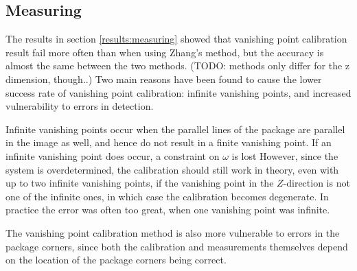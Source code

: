 
\subsection{Measuring}
The results in section \ref{results:measuring} showed that vanishing point calibration result fail more often than when using Zhang's method, but the accuracy is almost the same between the two methods. (TODO: methods only differ for the z dimension, though..) %
Two main reasons have been found to cause the lower success rate of vanishing point calibration: infinite vanishing points, and increased vulnerability to errors in detection.

Infinite vanishing points occur when the parallel lines of the package are parallel in the image as well, and hence do not result in a finite vanishing point. 
If an infinite vanishing point does occur, a constraint on $\omega$ is lost
However, since the system is overdetermined, the calibration should still work in theory, even with up to two infinite vanishing points, if the vanishing point in the $Z$-direction is not one of the infinite ones, in which case the calibration becomes degenerate.
In practice the error was often too great, when one vanishing point was infinite. %

The vanishing point calibration method is also more vulnerable to errors in the package corners, since both the calibration and measurements themselves depend on the location of the package corners being correct.


